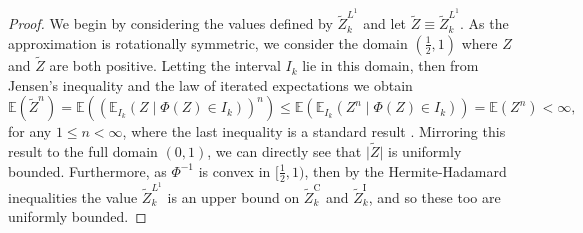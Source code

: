 \documentclass[manuscript,review]{acmart}
\begin{document}
\begin{proof}
We begin by considering the values defined by $ \tilde{Z}_k^{L^1} $ and let $ \tilde{Z} \equiv  \tilde{Z}_k^{L^1}$. As the approximation is rotationally symmetric, we consider the domain $ (\tfrac{1}{2}, 1) $ where $ Z $ and $ \tilde{Z} $ are both positive. Letting the interval $ I_k $ lie in this domain, then from Jensen's inequality and the law of iterated expectations we obtain 
\begin{equation*}
\mathbb{E}(\tilde{Z}^n) = \mathbb{E}((\mathbb{E}_{I_k}(Z \mid \Phi(Z) \in I_k))^n) \leq \mathbb{E}(\mathbb{E}_{I_k}(Z^n \mid \Phi(Z) \in I_k)) =  \mathbb{E}(Z^n) < \infty,
\end{equation*}
for any $ 1\leq n < \infty $, where the last inequality is a standard result \citep[appendix~C.2]{blundell2014concepts}. Mirroring this result to the full domain $ (0, 1) $, we can directly see that $ \lvert \tilde{Z} \rvert $ is uniformly bounded. Furthermore, as $ \Phi^{-1} $ is convex in $ [\tfrac{1}{2}, 1) $, then by the Hermite-Hadamard inequalities the value $ \tilde{Z}_k^{L^1} $ is an upper bound on $ \tilde{Z}_k^\mathrm{C} $ and $ \tilde{Z}_k^\mathrm{I} $, and so these too are uniformly bounded. 


\end{proof}
\end{document}
